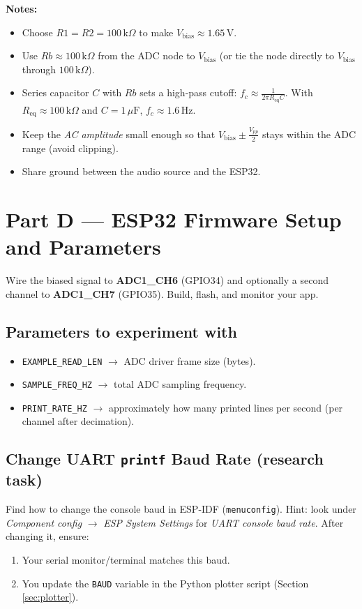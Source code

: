 \documentclass[11pt]{article}
\begin{document}
\textbf{Notes:}
\begin{itemize}
  \item Choose \(R1=R2=100\,\text{k}\Omega\) to make \(V_\text{bias}\approx 1.65\,\text{V}\).
  \item Use \(Rb\approx 100\,\text{k}\Omega\) from the ADC node to \(V_\text{bias}\) (or tie the node directly to \(V_\text{bias}\) through \(100\,\text{k}\Omega\)).
  \item Series capacitor \(C\) with \(Rb\) sets a high-pass cutoff: \(f_c \approx \frac{1}{2\pi R_\text{eq} C}\).
        With \(R_\text{eq}\approx 100\,\text{k}\Omega\) and \(C=1\,\mu\text{F}\), \(f_c \approx 1.6\,\text{Hz}\).
  \item Keep the \emph{AC amplitude} small enough so that \(V_\text{bias} \pm \frac{V_{pp}}{2}\) stays within the ADC range (avoid clipping).
  \item Share ground between the audio source and the ESP32.
\end{itemize}

\section*{Part D — ESP32 Firmware Setup and Parameters}
Wire the biased signal to \textbf{ADC1\_CH6} (GPIO34) and optionally a second channel to \textbf{ADC1\_CH7} (GPIO35). Build, flash, and monitor your app.

\subsection*{Parameters to experiment with}
\begin{itemize}
  \item \texttt{EXAMPLE\_READ\_LEN} \(\rightarrow\) ADC driver frame size (bytes).
  \item \texttt{SAMPLE\_FREQ\_HZ} \(\rightarrow\) total ADC sampling frequency.
  \item \texttt{PRINT\_RATE\_HZ} \(\rightarrow\) approximately how many printed lines per second (per channel after decimation).
\end{itemize}

\subsection*{Change UART \texttt{printf} Baud Rate (research task)}
Find how to change the console baud in ESP-IDF (\texttt{menuconfig}). Hint: look under \emph{Component config} $\rightarrow$ \emph{ESP System Settings} for \emph{UART console baud rate}. After changing it, ensure:
\begin{enumerate}
  \item Your serial monitor/terminal matches this baud.
  \item You update the \texttt{BAUD} variable in the Python plotter script (Section \ref{sec:plotter}).
\end{enumerate}
\end{document}
